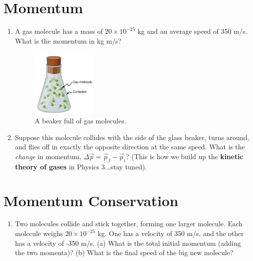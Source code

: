 \documentclass{article}
\begin{document}
\section{Momentum}

\begin{enumerate}
\item A gas molecule has a mass of $20 \times 10^{-25}$ kg and an average speed of 350 m/s.  What is the momentum in kg m/s? \\ \vspace{1cm}
\begin{figure}[ht]
\centering
\includegraphics[width=0.3\textwidth]{gas.png}
\caption{\label{fig:gas} A beaker full of gas molecules.}
\end{figure}
\item Suppose this molecule collides with the side of the glass beaker, turns around, and flies off in exactly the opposite direction at the same speed.  What is the \textit{change} in momentum, $\Delta \vec{p} = \vec{p}_f - \vec{p}_i$?  (This is how we build up the \textbf{kinetic theory of gases} in Physics 3...stay tuned). \\ \vspace{1cm}
\end{enumerate}

\section{Momentum Conservation}
\begin{enumerate}
\item Two molecules collide and stick together, forming one larger molecule.  Each molecule weighs $20 \times 10^{-25}$ kg.  One has a velocity of 350 m/s, and the other has a velocity of -350 m/s.  (a) What is the total initial momentum (adding the two momenta)? (b) What is the final speed of the big new molecule?
\end{enumerate}
\end{document}
